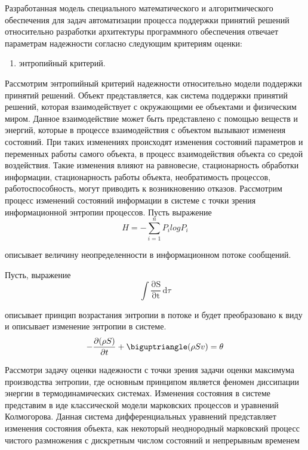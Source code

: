 Разработанная модель специального математического и алгоритмического обеспечения для задач автоматизации процесса поддержки принятий решений относительно разработки архитектуры программного обеспечения отвечает параметрам надежности согласно следующим критериям оценки:
\begin{enumerate}
    \item энтропийный критерий.
\end{enumerate}

Рассмотрим энтропийный критерий надежности относительно модели поддержки принятий решений. Объект представляется, как система поддержки принятий решений, которая взаимодействует с окружающими ее объектами и физическим миром. Данное взаимодействие может быть представлено с помощью веществ и энергий, которые в процессе взаимодействия с объектом вызывают изменеия состояний. При таких изменениях происходят изменения состояний параметров и переменных работы самого объекта, в процесс взаимодействия объекта со средой воздействия. Такие изменения влияют на равновесие, стационарность обработки информации, стационарность работы объекта, необратимость процессов, работоспособность, могут приводить к возникновению отказов. Рассмотрим процесс изменений состояний информации в системе с точки зрения информационной энтропии процессов.
Пусть выражение
\begin{equation}
    \label{eq:equation61}
     H = -\sum_{i=1}^n{P_ilogP_i}
\end{equation}

описывает величину неопределенности в информационном потоке сообщений.

Пусть, выражение
\begin{equation}
    \label{eq:equation62}
     \int \mathrm{\frac{\partial S}{\partial t}}\,\mathrm{d}\tau
\end{equation}

описывает принцип возрастания энтропии в потоке и будет преобразовано к виду и описывает изменение энтропии в системе.
\begin{equation}
    \label{eq:equation63}
     -\frac{\partial(\rho S)}{\partial t} + \biguptriangle (\rho S v) = \theta
\end{equation}

Рассмотри задачу оценки надежности с точки зрения задачи оценки максимума производства энтропии, где основным принципом является феномен диссипации энергии в термодинамических системах. Изменения состояния в системе представим в иде классической модели марковских процессов и уравнений Колмогорова. Данная система дифференциальных уравнений представляет изменения состояния объекта, как некоторый неоднородный марковский процесс чистого размножения с дискретным числом состояний и непрерывным временем


